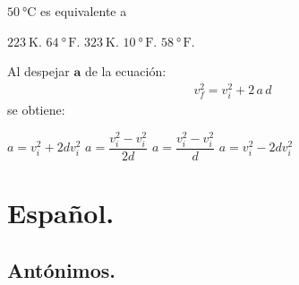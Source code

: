 \documentclass[12pt]{exam}
\begin{document}
\begin{multicols}{2}
\begin{questions}
    \question $\SI{50}{\degreeCelsius}$ es equivalente a
    \begin{choices}
        \choice $\SI{223}{\kelvin}$.
        \choice $\SI{64}{\degree} \, \text{F}$.
        \choice $\SI{323}{\kelvin}$.
        \choice $\SI{10}{\degree} \, \text{F}$.
        \choice $\SI{58}{\degree} \, \text{F}$.
    \end{choices}
    \question Al despejar $\mathbf{a}$ de la ecuación:
    \begingroup
    \abovedisplayskip=0pt
    \belowdisplayskip=-10pt
    \begin{align*}
   v_{f}^{2} = v_{i}^{2} + 2 \, a \, d
    \end{align*}
    \endgroup
    se obtiene:
    \begin{choices}
        \choice $a = v_{i}^{2} + 2 d v_{i}^{2}$
        \choice $a = \dfrac{v_{i}^{2} - v_{i}^{2}}{2 d}$
        \choice $a = \dfrac{v_{i}^{2} - v_{i}^{2}}{d}$
        \choice $a =v_{i}^{2} - 2 d v_{i}^{2}$
    \end{choices}


\section{Español.}

\subsection{Antónimos.}


\end{questions}
\end{multicols}
\end{document}
